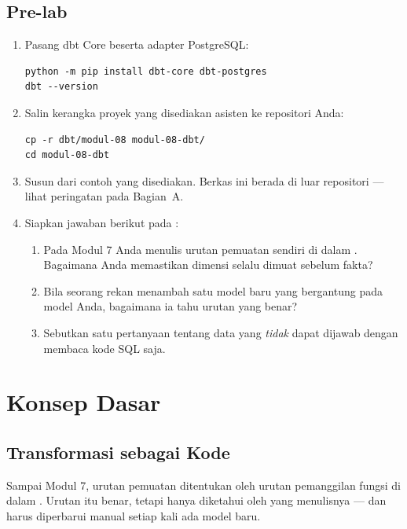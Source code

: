 \subsection{Pre-lab}

\begin{enumerate}[leftmargin=1.4em]
  \item Pasang dbt Core beserta adapter PostgreSQL:
\begin{lstlisting}[style=shellgaya]
python -m pip install dbt-core dbt-postgres
dbt --version
\end{lstlisting}
  \item Salin kerangka proyek yang disediakan asisten ke repositori Anda:
\begin{lstlisting}[style=shellgaya]
cp -r dbt/modul-08 modul-08-dbt/
cd modul-08-dbt
\end{lstlisting}
  \item Susun  dari contoh yang
        disediakan. Berkas ini berada di luar repositori --- lihat peringatan
        pada Bagian~A.
  \item Siapkan jawaban berikut pada :
  \begin{enumerate}[label=\alph*.,leftmargin=1.4em]
    \item Pada Modul 7 Anda menulis urutan pemuatan sendiri di dalam
          . Bagaimana Anda memastikan dimensi selalu dimuat
          sebelum fakta?
    \item Bila seorang rekan menambah satu model baru yang bergantung pada
          model Anda, bagaimana ia tahu urutan yang benar?
    \item Sebutkan satu pertanyaan tentang data yang \emph{tidak} dapat dijawab
          dengan membaca kode SQL saja.
  \end{enumerate}
\end{enumerate}

\section{Konsep Dasar}

\subsection{Transformasi sebagai Kode}

Sampai Modul 7, urutan pemuatan ditentukan oleh urutan pemanggilan fungsi di
dalam . Urutan itu benar, tetapi hanya diketahui oleh yang
menulisnya --- dan harus diperbarui manual setiap kali ada model baru.

